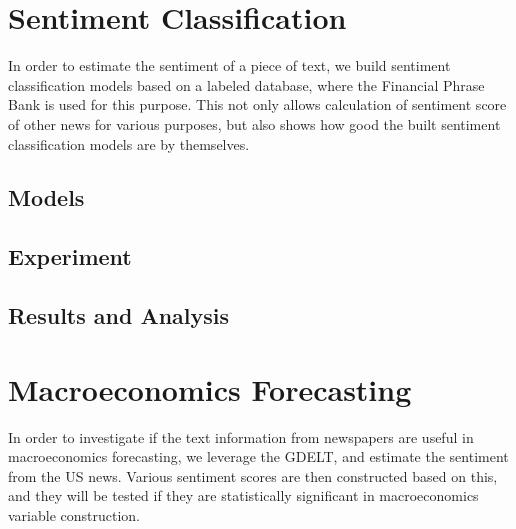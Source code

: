 \documentclass[11pt,a4paper]{article}
\begin{document}
\section{Sentiment Classification}

In order to estimate the sentiment of a piece of text, we build sentiment classification models based on a labeled database, where the Financial Phrase Bank is used for this purpose. This not only allows calculation of sentiment score of other news for various purposes, but also shows how good the built sentiment classification models are by themselves.


\subsection{Models}


\subsection{Experiment}


\subsection{Results and Analysis}


\section{Macroeconomics Forecasting}

In order to investigate if the text information from newspapers are useful in macroeconomics forecasting, we leverage the GDELT, and estimate the sentiment from the US news. Various sentiment scores are then constructed based on this, and they will be tested if they are statistically significant in macroeconomics variable construction.
\end{document}
